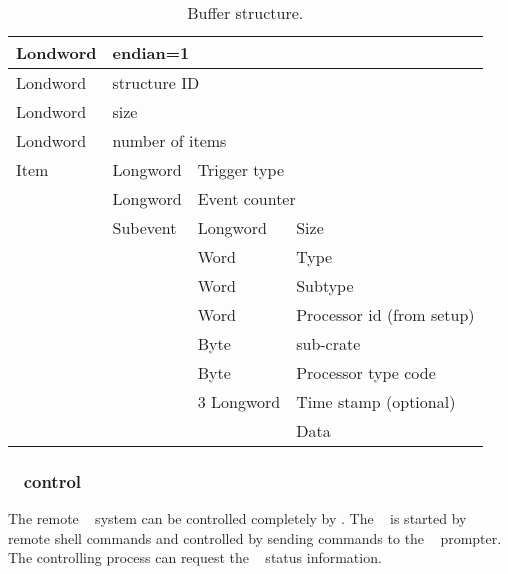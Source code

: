 \begin{table}[h]
\begin{tabular}{|p{2.0cm}|p{2.0cm}|p{2.0cm}|p{8.0cm}|}      \hline
Londword & \multicolumn{3}{l|}{endian=1} \\ \hline
Londword & \multicolumn{3}{l|}{structure ID} \\ \hline
Londword & \multicolumn{3}{l|}{size} \\ \hline
Londword & \multicolumn{3}{l|}{number of items} \\ \hline
Item & Longword & \multicolumn{2}{l|}{Trigger type} \\ \hline
 & Longword & \multicolumn{2}{l|}{Event counter} \\ \hline
 & Subevent & Longword & Size \\ \hline
 &  & Word & Type \\ \hline
 &  & Word & Subtype \\ \hline
 &  & Word & Processor id (from setup)\\ \hline
 &  & Byte & sub-crate \\ \hline
 &  & Byte & Processor type code \\ \hline
 &  & 3 Longword & Time stamp (optional) \\ \hline
 &  & & Data \\ \hline
\end{tabular}
\caption{Buffer structure.}
\label{dabc-mbs-buffer-table}
\end{table}


\subsubsection{\mbs~ control}
The remote \mbs~ system can be controlled completely by \dabc.
The \mbs~ is started by remote shell commands and controlled by
sending commands to the \mbs~ prompter. The controlling process
can request the \mbs~ status information.
